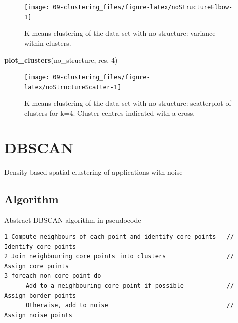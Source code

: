 \documentclass[]{book}
\newenvironment{Shaded}{\begin{snugshade}}{\end{snugshade}}
\newcommand{\KeywordTok}[1]{\textcolor[rgb]{0.13,0.29,0.53}{\textbf{{#1}}}}
\newcommand{\DecValTok}[1]{\textcolor[rgb]{0.00,0.00,0.81}{{#1}}}
\newcommand{\NormalTok}[1]{{#1}}
\theoremstyle{definition}
\theoremstyle{definition}
\theoremstyle{definition}
\theoremstyle{remark}
\begin{document}
\begin{figure}

{\centering \texttt{[image: 09-clustering\_files/figure-latex/noStructureElbow-1]} 

}

\caption{K-means clustering of the data set with no structure: variance within clusters.}\label{fig:noStructureElbow}
\end{figure}

\begin{Shaded}
\begin{Highlighting}[]
\KeywordTok{plot_clusters}\NormalTok{(no_structure, res, }\DecValTok{4}\NormalTok{)}
\end{Highlighting}
\end{Shaded}

\begin{figure}

{\centering \texttt{[image: 09-clustering\_files/figure-latex/noStructureScatter-1]} 

}

\caption{K-means clustering of the data set with no structure: scatterplot of clusters for k=4. Cluster centres indicated with a cross.}\label{fig:noStructureScatter}
\end{figure}

\section{DBSCAN}\label{dbscan}

Density-based spatial clustering of applications with noise

\subsection{Algorithm}\label{algorithm-1}

Abstract DBSCAN algorithm in pseudocode \citep{Schubert2017}

\begin{verbatim}
1 Compute neighbours of each point and identify core points   // Identify core points
2 Join neighbouring core points into clusters                 // Assign core points
3 foreach non-core point do
      Add to a neighbouring core point if possible            // Assign border points
      Otherwise, add to noise                                 // Assign noise points
\end{verbatim}
\end{document}
